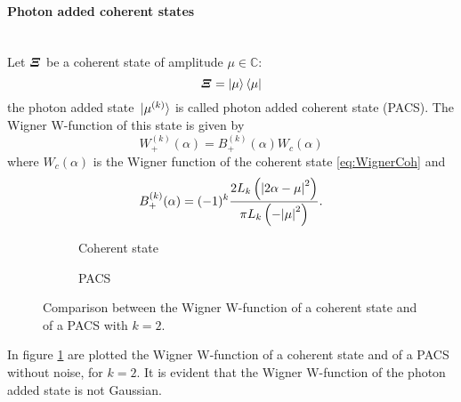         \paragraph{Photon added coherent states}\mbox{}\\
        Let $\bm{\relax{\varXi}}$ be a coherent state of amplitude $\mu \in \mathbb{C}$: 
        \begin{equation*}
            \bm{\relax{\varXi}}=\ket{\mu}\bra{\mu}
        \end{equation*}
        the photon added state $\ket*{\mu^{(k)}}$ is called photon added coherent state
        (PACS).
        The Wigner W-function of this state is given by \cite{tesiGuerrini}
        \begin{equation}
            W_+^{(k)}(\alpha) = B_+^{(k)}(\alpha) W_c(\alpha)
        \end{equation}
        where $W_c(\alpha)$ is the Wigner function of the coherent state \ref{eq:WignerCoh} and
        \begin{equation}
            B_+^{(k)}(\alpha) = (-1)^k \frac{2 L_k \left( \absolutevalue{2\alpha-\mu}^2 \right)}
            {\pi L_k \left(-\absolutevalue{\mu}^2 \right)}.
            \label{eq:B_plus}
        \end{equation}

        \begin{figure}[t]
            \begin{center}
                \begin{subfigure}{0.49\textwidth}
                    
                    \caption{Coherent state}
                \end{subfigure}
                \begin{subfigure}{0.49\textwidth}
                    
                    \caption{PACS}
                \end{subfigure}
                \caption{Comparison between the Wigner W-function of a coherent state and 
                of a PACS with $k=2$.}
                \label{fig:WignerPACS}
            \end{center}
        \end{figure}
        In figure \ref{fig:WignerPACS} are plotted the Wigner W-function of a coherent
        state and of a PACS without noise, for $k=2$. It is evident that the Wigner 
        W-function of the photon added state is not Gaussian.


